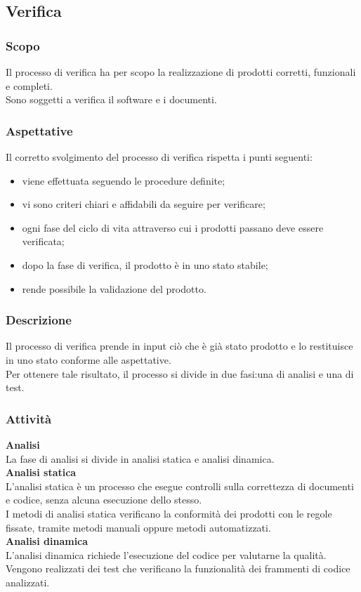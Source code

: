\subsection{Verifica} 
    \label{verifica}
    \subsubsection{Scopo}
    Il processo di verifica ha per scopo la realizzazione di prodotti corretti, funzionali e completi.\\Sono soggetti a verifica il software e i documenti.
    \subsubsection{Aspettative}
    Il corretto svolgimento del processo di verifica rispetta i punti seguenti:
    \begin{itemize}
    	\item viene effettuata seguendo le procedure definite;
    	\item vi sono criteri chiari e affidabili da seguire per verificare;
    	\item ogni fase del ciclo di vita attraverso cui i prodotti passano deve essere verificata;
    	\item dopo la fase di  verifica, il prodotto è in uno stato stabile;
    	\item rende possibile la validazione del prodotto.
    \end{itemize}
    \subsubsection{Descrizione}
    Il processo di verifica prende in input ciò che è già stato prodotto e lo restituisce in uno stato conforme alle aspettative.\\Per ottenere tale risultato, il processo si divide in due fasi:una di analisi e una di test.
    \subsubsection{Attività}
    \textbf{Analisi}\\
    La fase di analisi si divide in analisi statica e analisi dinamica.\\
    \textbf{Analisi statica}\\
    L'analisi statica è un processo che esegue controlli sulla correttezza di documenti e codice, senza alcuna esecuzione dello stesso.\\I metodi di analisi statica verificano la conformità dei prodotti con le regole fissate, tramite metodi manuali oppure metodi automatizzati.\\ 
    \textbf{Analisi dinamica}\\
    L'analisi dinamica richiede l'esecuzione del codice per valutarne la qualità.\\Vengono realizzati dei test  che verificano la funzionalità dei frammenti di codice analizzati.
    
